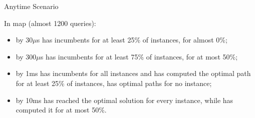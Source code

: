 \begin{frame}{Anytime Scenario}

    In  map (almost 1200 queries):

    \begin{itemize}
        \item by 30$\mu$s \anytimeCPDSearch{} has incumbents for at least 25\% of instances, \AWA{} for almost 0\%;
        \item by 300$\mu$s \anytimeCPDSearch{} has incumbents for at least 75\% of instances, \AWA{} for at most 50\%;
        \item by 1ms \anytimeCPDSearch{} has incumbents for all instances and has computed the optimal path for at least 25\% of instances, \AWA{} has optimal paths for no instance;
        \item by 10ms \anytimeCPDSearch{} has reached the optimal solution for every instance, while \AWA{} has computed it for at most 50\%.
    \end{itemize}
\end{frame}

